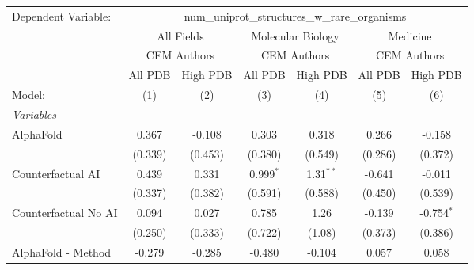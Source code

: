\begingroup
\centering
\begin{tabular}{lcccccc}
   \tabularnewline \midrule \midrule
   Dependent Variable: & \multicolumn{6}{c}{num\_uniprot\_structures\_w\_rare\_organisms}\\
 & \multicolumn{2}{c}{All Fields} & \multicolumn{2}{c}{Molecular Biology} & \multicolumn{2}{c}{Medicine} \\
\cmidrule(lr){2-3} \cmidrule(lr){4-5} \cmidrule(lr){6-7}
 & \multicolumn{2}{c}{CEM Authors} & \multicolumn{2}{c}{CEM Authors} & \multicolumn{2}{c}{CEM Authors} \\
\cmidrule(lr){2-3} \cmidrule(lr){4-5} \cmidrule(lr){6-7}
 & \multicolumn{1}{c}{All PDB} & \multicolumn{1}{c}{High PDB} & \multicolumn{1}{c}{All PDB} & \multicolumn{1}{c}{High PDB} & \multicolumn{1}{c}{All PDB} & \multicolumn{1}{c}{High PDB} \\
\cmidrule(lr){2-2} \cmidrule(lr){3-3} \cmidrule(lr){4-4} \cmidrule(lr){5-5} \cmidrule(lr){6-6} \cmidrule(lr){7-7}
   Model:                                                     & (1)          & (2)          & (3)           & (4)           & (5)          & (6)\\  
   \midrule
   \emph{Variables}\\
   AlphaFold                                                  & 0.367        & -0.108       & 0.303         & 0.318         & 0.266        & -0.158\\   
                                                              & (0.339)      & (0.453)      & (0.380)       & (0.549)       & (0.286)      & (0.372)\\   
   Counterfactual AI                                          & 0.439        & 0.331        & 0.999$^{*}$   & 1.31$^{**}$   & -0.641       & -0.011\\   
                                                              & (0.337)      & (0.382)      & (0.591)       & (0.588)       & (0.450)      & (0.539)\\   
   Counterfactual No AI                                       & 0.094        & 0.027        & 0.785         & 1.26          & -0.139       & -0.754$^{*}$\\   
                                                              & (0.250)      & (0.333)      & (0.722)       & (1.08)        & (0.373)      & (0.386)\\   
   AlphaFold - Method                                         & -0.279       & -0.285       & -0.480        & -0.104        & 0.057        & 0.058\\   

\end{tabular}

